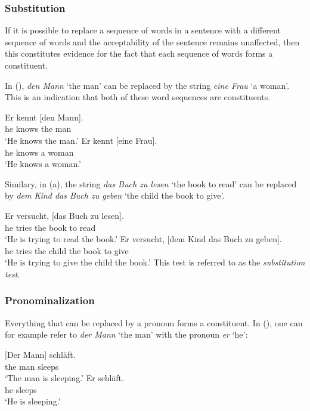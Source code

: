 \subsubsection{Substitution}

If it is possible to replace a sequence of words in a sentence with a different sequence of words and the acceptability of the sentence 
remains unaffected, then this constitutes evidence for the fact that each sequence of words forms a constituent.

In (), \emph{den Mann} `the man' can be replaced by the string \emph{eine Frau} `a woman'. This is an indication that both of
these word sequences are constituents. 

\eal
\ex 
\gll Er kennt [den Mann].\\
     he knows \spacebr{}the man\\
\glt `He knows the man.'
\ex 
\gll Er kennt [eine Frau].\\
     he knows \spacebr{}a woman\\
\glt `He knows a woman.'
\zl

\noindent
Similary, in (a), the string \emph{das Buch zu lesen} `the book to read' can be replaced
by \emph{dem Kind das Buch zu geben} `the child the book to give'.

\eal
\ex\label{ex-das-buch-zu-lesen} 
\gll Er versucht, [das Buch zu lesen].\\
     he tries \spacebr{}the book to read\\
\glt `He is trying to read the book.'
\ex 
\gll Er versucht, [dem Kind das Buch zu geben].\\
     he tries \spacebr{}the child the book to give\\
\glt `He is trying to give the child the book.'
\zl
%
This test is referred to as the \emph{substitution test}.


\subsubsection{Pronominalization}

Everything that can be replaced by a pronoun forms a constituent.
In (), one can for example refer to \emph{der Mann} `the man' with the pronoun \emph{er} `he':

\eal
\ex 
\gll {}[Der Mann] schläft.\\
	 {}\spacebr{}the man sleeps\\
\glt `The man is sleeping.'
\ex 
\gll Er schläft.\\
	 he sleeps\\
\glt `He is sleeping.'
\zl

